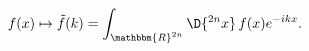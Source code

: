 \begin{equation}
 f(x)\mapsto\tilde{f}(k)=\int_{\mathbbm{R}^{2n}}\D{ ^{2n}x}\,f(x)e^{-ikx}.
\end{equation}

